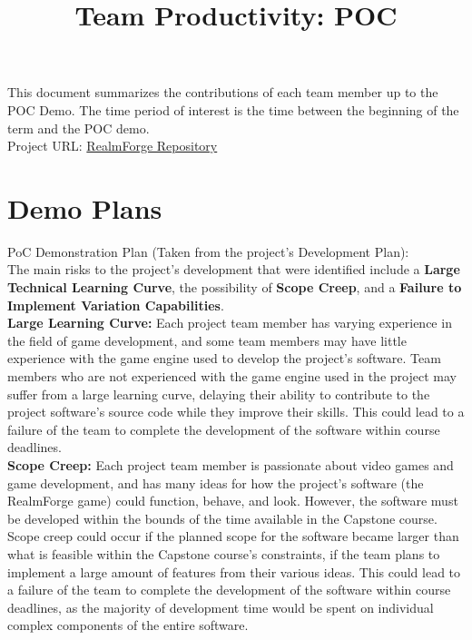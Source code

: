 \documentclass{article}
\title{Team Productivity: POC\\\progname}
\author{\authname}
\date{}
\begin{document}
\maketitle

\noindent This document summarizes the contributions of each team member up to 
the POC
Demo.  The time period of interest is the time between the beginning of the term
and the POC demo.\\

\noindent Project URL: 
\href{https://github.com/Aeolus-Software/RealmForge}{RealmForge 
Repository}

\section{Demo Plans}

PoC Demonstration Plan (Taken from the project's Development Plan):\\

\noindent The main risks to the project's development that were identified 
include a 
\textbf{Large Technical Learning Curve}, the possibility of \textbf{Scope 
	Creep}, and a \textbf{Failure to Implement Variation Capabilities}.
\\

\noindent \textbf{Large Learning Curve:} Each project team member has varying 
experience in the field of game development, and some team members may have 
little experience with the game engine used to develop the project's software. 
Team members who are not experienced with the game engine used in the project 
may suffer from a large learning curve, delaying their ability to contribute to 
the project software's source code while they improve their skills. This could 
lead to a failure of the team to complete the development of the software 
within course deadlines.
\\ 

\noindent \textbf{Scope Creep:} Each project team member is passionate about 
video games and game development, and has many ideas for how the project's 
software (the RealmForge game) could function, behave, and look. However, the 
software must be developed within the bounds of the time available in the 
Capstone course. Scope creep could occur if the planned scope for the software 
became larger than what is feasible within the Capstone course's constraints, 
if the team plans to implement a large amount of features from their various 
ideas. This could lead to a failure of the team to complete the development of 
the software within course deadlines, as the majority of development time 
would be spent on individual complex components of the entire software.
\\
\end{document}
